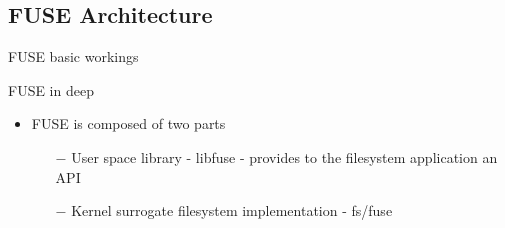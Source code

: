 \documentclass{beamer}
\begin{document}
\subsection{FUSE Architecture}

\begin{frame}{FUSE basic workings}
	
	
	\let\thefootnote\relax{}
	
\end{frame}

\begin{frame}{FUSE in deep}
	
	\begin{itemize}[<+->]

		\item{FUSE is composed of two parts}
			\begin{itemize}
				\item[$-$]{User space library - libfuse - provides to the filesystem application an API}
				\item[$-$]{Kernel surrogate filesystem implementation - fs/fuse }
			\end{itemize}	
	
	\end{itemize}
	
\end{frame}
\end{document}
